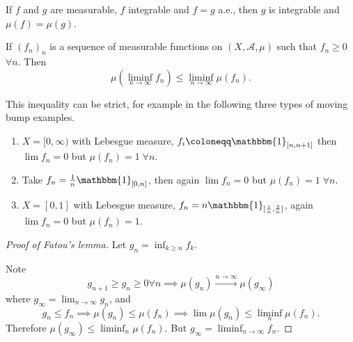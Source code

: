 \documentclass{article}
\newcommand{\1}[1]{\mathbbm{1}_{#1}}
\begin{document}
\begin{remark}
    If $f$ and $g$ are measurable, $f$ integrable and $f = g$ a.e., then $g$ is integrable and $\mu(f) = \mu(g)$.
\end{remark}

\begin{thm}
    If $(f_n)_n$ is a sequence of measurable functions on $(X, \mathcal{A}, \mu)$ such that $f_n \geq 0$ $\forall n$.
    Then
    \begin{equation*}
        \mu(\liminf_{n \to \infty} f_n) \leq \liminf_{n \to \infty} \mu(f_n).
    \end{equation*}
\end{thm}

\begin{remark}
    This inequality can be strict, for example in the following three types of moving bump examples.
    \begin{enumerate}[label=(\alph*)]
        \item $X = [0, \infty)$ with Lebesgue measure, $f_i \coloneqq \1{[n, n+1]}$ then $\lim f_n = 0$ but $\mu(f_n) = 1 \; \forall n$.
        \item Take $f_n = \frac{1}{n} \1{[0, n]}$, then again $\lim f_n = 0$ but $\mu(f_n) = 1 \; \forall n$.
        \item $X = [0, 1]$ with Lebesgue measure, $f_n = n \1{[\frac{1}{n}, \frac{2}{n}]}$, again $\lim f_n = 0$ but $\mu(f_n) = 1$.
    \end{enumerate}
\end{remark}

\begin{proof}[Proof of Fatou's lemma]
    Let $g_n = \inf_{k \geq n} f_k$.

    Note
    \begin{equation*}
        g_{n + 1} \geq g_n \geq 0 \forall n \implies \mu(g_n) \xrightarrow{n \to \infty} \mu(g_\infty)
    \end{equation*}
    where $g_\infty = \lim_{n \to \infty} g_n$, and
    \begin{equation*}
        g_n \leq f_n \implies \mu(g_n) \leq \mu(f_n) \implies \lim \mu(g_n) \leq \liminf_n \mu(f_n).
    \end{equation*}
    Therefore $\mu(g_\infty) \leq \liminf_n \mu(f_n)$. But $g_\infty = \liminf_{n \to \infty} f_n$.
\end{proof}
\end{document}
